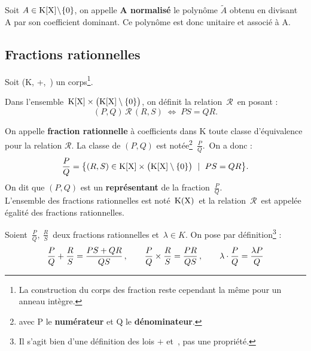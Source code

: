 \vspace{2.2cm}

Soit \(A\in \text{K}[\text{X}]\!\setminus \!\{0\}\), on appelle \textbf{A normalisé} le polynôme $\tilde{A}$ obtenu en divisant A par son coefficient dominant. Ce polynôme est donc unitaire et associé à A.

\vspace{2cm}

\subsection{Fractions rationnelles}

\vspace{0.5cm}

\begin{center}
    Soit (K, +,\ \x) un corps\footnote{La construction du corps des fraction reste cependant la même pour un anneau intègre.}.
\end{center}

\vspace{0.5cm}

\noindent Dans l'ensemble $\,\text{K}[\text{X}]\times \bigl(\text{K}[\text{X}]\setminus \{0\}\bigr)$, on définit la relation $\,\mathcal{R}\,$ en posant : \vspace{-0.2cm}
\[(P,Q)\,\mathcal{R}\,(R,S)\; \Leftrightarrow \; PS=QR.\]

\vspace{1cm}

\noindent On appelle \textbf{fraction rationnelle} à coefficients dans K toute classe d'équivalence pour la relation \(\mathcal{R}\). La classe de $(P,Q)$ est notée\footnote{avec P le \textbf{numérateur} et Q le \textbf{dénominateur}.} \(\displaystyle\,\frac{P}{Q}.\,\) On a donc : \vspace{-0.2cm}
\[\frac{P}{Q}=\bigl\{(R,S)\in \poly\times \bigl(\poly\setminus \{0\}\bigr) \ \mid \ PS=QR\bigr\}.\] 
On dit que $(P,Q)$ est un \textbf{représentant} de la fraction \(\,\displaystyle\frac{P}{Q}\). \vspace{0.2cm}\\
L'ensemble des fractions rationnelles est noté $\,\text{K}(\text{X})\,$ et la relation \(\,\mathcal{R}\,\) est appelée égalité des fractions rationnelles.

\vspace{1.4cm}

Soient \(\,\displaystyle \frac{P}{Q},\ \displaystyle\frac{R}{S}\,\) deux fractions rationnelles et $\,\lambda\in K$. On pose par définition\footnote{Il s'agit bien d'une définition des lois $+$ et \x\,, pas une propriété.} :\vspace{-0.2cm}
\[\frac{P}{Q}+ \frac{R}{S}=\frac{PS+QR}{QS}\,,\qquad \frac{P}{Q}\times \frac{R}{S}=\frac{PR}{QS}\,,\qquad\lambda\cdot\frac{P}{Q}=\frac{\lambda P}{Q}\vspace{0.2cm}\]

